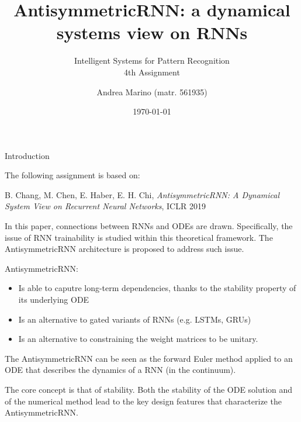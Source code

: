 \documentclass[10pt,xcolor={table,dvipsnames}]{beamer} 		%
\title[ISPR Assignment 4]{AntisymmetricRNN: a dynamical systems view on RNNs}	%
\subtitle{Intelligent Systems for Pattern Recognition\\ 4th Assignment}
\author[Andrea Marino]{Andrea Marino {\smaller (matr. 561935)}}
\institute[DI UniPi]{Università di Pisa}
\date{\today}
\theoremstyle{plain}					%
\theoremstyle{definition}
\theoremstyle{remark}
\begin{document}
	\begin{frame}[plain]
		\titlepage
	\end{frame}
	
%	
	\begin{frame}{Introduction}
		\begin{block}{}
			The following assignment is based on:

			B. Chang, M. Chen, E. Haber, E. H. Chi, 
			\emph{AntisymmetricRNN: A Dynamical System View on Recurrent Neural Networks}, ICLR 2019

		\end{block}

		In this paper, connections between RNNs and ODEs are drawn. 
		Specifically, the issue of RNN trainability is studied within this theoretical framework. 
		The AntisymmetricRNN architecture is proposed to address such issue. %
		\smallskip 

		AntisymmetricRNN:
		\begin{itemize}
			\item Is able to caputre long-term dependencies, thanks to the stability property of its 
			underlying ODE
			\item Is an alternative to gated variants of RNNs {\smaller (e.g. LSTMs, GRUs)}
			\item Is an alternative to constraining the weight matrices to be unitary. 
		\end{itemize}
		\medskip

		The AntisymmetricRNN can be seen as the forward Euler method 
		applied to an ODE that describes the dynamics of a RNN {\smaller (in the continuum)}.
		\smallskip

		The core concept is that of \alert{stability}. 
		Both the stability of the ODE solution and of the 
		numerical method lead to the key design features that characterize the AntisymmetricRNN.
	\end{frame}
\end{document}
